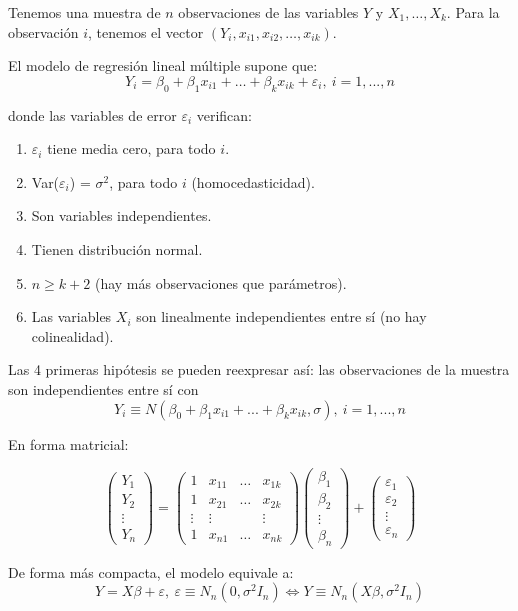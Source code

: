 Tenemos una muestra de $n$ observaciones de las variables $Y$ y $X_1,…,X_k$. Para la observación $i$, tenemos el vector $(Y_i,x_{i1},x_{i2},…,x_{ik})$.

El modelo de regresión lineal múltiple supone que:
\[Y_i=β_0+β_1x_{i1}+…+β_kx_{ik}+ε_i,\ i=1,...,n\]

donde las variables de error $ε_i$ verifican:
\begin{enumerate}
\item $ε_i$ tiene media cero, para todo $i$.
\item Var($ε_i$) = $σ^2$, para todo $i$ (homocedasticidad).
\item Son variables independientes.
\item Tienen distribución normal.
\item $n ≥ k + 2$ (hay más observaciones que parámetros).
\item Las variables $X_i$ son linealmente independientes entre sí (no hay colinealidad).
\end{enumerate}

Las 4 primeras hipótesis se pueden reexpresar así: las observaciones de la muestra son independientes entre sí con
\[Y_i \equiv N(β_0 +β_1x_{i1} +...+β_kx_{ik},σ),\ i=1,...,n\]

En forma matricial:

\[
	\begin{pmatrix}
		Y_1\\
		Y_2\\
		\vdots \\
		Y_n
	\end{pmatrix}
	=
	\begin{pmatrix}
		1 & x_{11} & … & x_{1k} \\
		1 & x_{21} & … & x_{2k} \\
		\vdots & \vdots &  & \vdots \\
		1 & x_{n1} & … & x_{nk}
	\end{pmatrix}
	\begin{pmatrix}
		β_1\\
		β_2\\
		\vdots \\
		β_n
	\end{pmatrix}
	+
	\begin{pmatrix}
		ε_1\\
		ε_2\\
		\vdots \\
		ε_n
	\end{pmatrix}
\]


De forma más compacta, el modelo equivale a:
\[Y =Xβ+ε,\ ε \equiv N_n(0,σ^2I_n) \iff Y \equiv N_n(Xβ,σ^2I_n)\]

